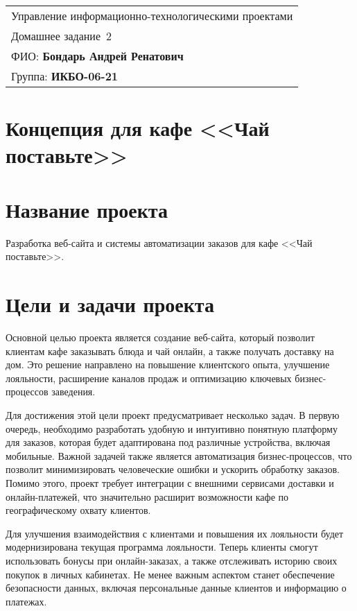 \begin{tabular}{|l|}
	\hline
	Управление информационно-технологическими проектами \\
	Домашнее задание \No\,2 \\ \hline
	ФИО: \textbf{Бондарь Андрей Ренатович} \\ \hline
	Группа: \textbf{ИКБО-06-21} \\ \hline
\end{tabular}

\section*{Концепция для кафе <<Чай поставьте>>}

\section{Название проекта}

Разработка веб-сайта
и системы автоматизации заказов для кафе <<Чай поставьте>>.

\section{Цели и задачи проекта}

Основной целью проекта является создание веб-сайта,
который позволит клиентам кафе заказывать блюда и чай онлайн,
а также получать доставку на дом.
Это решение направлено на повышение клиентского опыта, улучшение лояльности,
расширение каналов продаж и оптимизацию ключевых бизнес-процессов заведения.

Для достижения этой цели проект предусматривает несколько задач. В первую очередь, необходимо разработать удобную и интуитивно понятную платформу для заказов, которая будет адаптирована под различные устройства, включая мобильные. Важной задачей также является автоматизация бизнес-процессов, что позволит минимизировать человеческие ошибки и ускорить обработку заказов. Помимо этого, проект требует интеграции с внешними сервисами доставки и онлайн-платежей, что значительно расширит возможности кафе по географическому охвату клиентов.

Для улучшения взаимодействия с клиентами и повышения их лояльности будет модернизирована текущая программа лояльности. Теперь клиенты смогут использовать бонусы при онлайн-заказах, а также отслеживать историю своих покупок в личных кабинетах. Не менее важным аспектом станет обеспечение безопасности данных, включая персональные данные клиентов и информацию о платежах.

